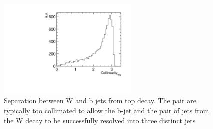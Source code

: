 \begin{figure}
  \centering
  \includegraphics[width=0.6\textwidth]{figures/WBCollinearity}
  \caption[Separation between W and b jet from top decay]{Separation between W and b jets from top decay. The pair are typically too collimated to allow the b-jet and the pair of jets from the W decay to be successfully resolved into three distinct jets}
  \label{fig:Collimated}
\end{figure}

